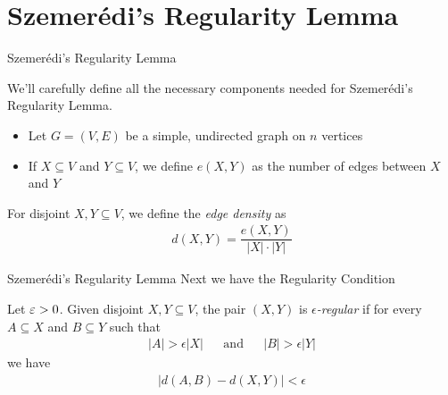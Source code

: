 \section{Szemer\'{e}di's Regularity Lemma}
\begin{frame}{Szemer\'{e}di's Regularity Lemma}
	
We'll carefully define all the necessary components needed for Szemer\'{e}di's Regularity Lemma.
\begin{itemize}
	\item Let $G = (V,E)$ be a simple, undirected graph on $n$ vertices
	\item If $X \subseteq V$ and $Y \subseteq V$, we define $e(X,Y)$ as the number of edges between $X$ and $Y$
\end{itemize}
\begin{definition}
	For disjoint $X,Y \subseteq V$, we define the {\em edge density} as
	\begin{align*}
		d(X,Y) = \dfrac{e(X,Y)}{|X|\cdot |Y|}
	\end{align*}
\end{definition}
	
\end{frame}

\begin{frame}{Szemer\'{e}di's Regularity Lemma}
Next we have the Regularity Condition
\begin{definition}
	Let $\varepsilon > 0$. Given disjoint $X, Y \subseteq V$, the pair $(X,Y)$ is {\em $\epsilon$-regular} if for every $A \subseteq X$ and $B \subseteq Y$ such that
	\begin{align*}
		|A| > \epsilon|X| & & \text{and} & & |B| > \epsilon|Y|
	\end{align*}
	we have
	\begin{align*}
		|d(A,B) - d(X,Y)| < \epsilon
	\end{align*}
\end{definition}
\end{frame}

